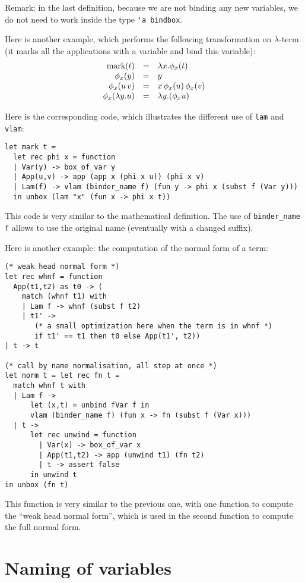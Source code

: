 \documentclass[11pt]{article}
\begin{document}
Remark: in the last definition, because we are not binding any new
variables, we do not need to work inside the type \verb#'a bindbox#.

Here is another example, which performs the following transformation on
$\lambda$-term (it marks all the applications with a variable and bind this variable):
$$
\begin{array}{rcl}
\hbox{mark}(t) &=& \lambda x.\phi_x(t) \cr
\phi_x(y) &=& y \cr
\phi_x(u\,v) &=& x\,\phi_x(u)\,\phi_x(v) \cr
\phi_x(\lambda y.u) &=& \lambda y.(\phi_x u)
\end{array}
$$

Here is the corresponding code, which illustrates the different use
of \verb#lam# and \verb#vlam#:

\begin{verbatim}
let mark t =
  let rec phi x = function
  | Var(y) -> box_of_var y
  | App(u,v) -> app (app x (phi x u)) (phi x v)
  | Lam(f) -> vlam (binder_name f) (fun y -> phi x (subst f (Var y)))
  in unbox (lam "x" (fun x -> phi x t))
\end{verbatim}

This code is very similar to the mathematical definition.
The use of \verb#binder_name f# allows to use the original name
(eventually with a changed suffix).

Here is another example: the computation of the normal form of a term:

\begin{verbatim}
(* weak head normal form *)
let rec whnf = function
  App(t1,t2) as t0 -> (
    match (whnf t1) with
    | Lam f -> whnf (subst f t2)
    | t1' ->
       (* a small optimization here when the term is in whnf *)
       if t1' == t1 then t0 else App(t1', t2))
| t -> t

(* call by name normalisation, all step at once *)
let norm t = let rec fn t =
  match whnf t with
  | Lam f ->
      let (x,t) = unbind fVar f in
      vlam (binder_name f) (fun x -> fn (subst f (Var x)))
  | t ->
      let rec unwind = function
        | Var(x) -> box_of_var x
        | App(t1,t2) -> app (unwind t1) (fn t2)
        | t -> assert false
      in unwind t
in unbox (fn t)
\end{verbatim}

This function is very similar to the previous one, with one function
to compute the ``weak head normal form'', which is used in the second
function to compute the full normal form.

\section{Naming of variables}
\end{document}
